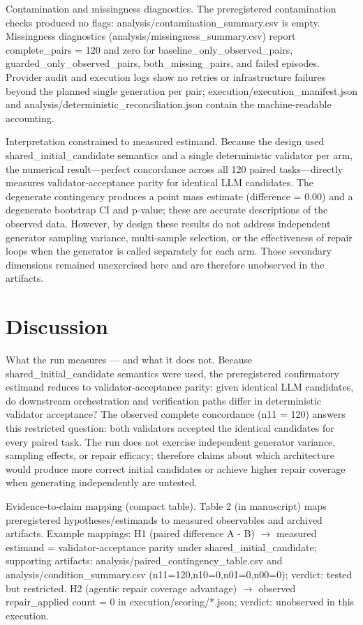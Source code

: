 \documentclass[conference]{IEEEtran}
\begin{document}
Contamination and missingness diagnostics. The preregistered contamination checks produced no flags: analysis/contamination\_summary.csv is empty. Missingness diagnostics (analysis/missingness\_summary.csv) report complete\_pairs = 120 and zero for baseline\_only\_observed\_pairs, guarded\_only\_observed\_pairs, both\_missing\_pairs, and failed episodes. Provider audit and execution logs show no retries or infrastructure failures beyond the planned single generation per pair; execution/execution\_manifest.json and analysis/deterministic\_reconciliation.json contain the machine‑readable accounting.

Interpretation constrained to measured estimand. Because the design used shared\_initial\_candidate semantics and a single deterministic validator per arm, the numerical result---perfect concordance across all 120 paired tasks---directly measures validator‑acceptance parity for identical LLM candidates. The degenerate contingency produces a point mass estimate (difference = 0.00) and a degenerate bootstrap CI and p‑value; these are accurate descriptions of the observed data. However, by design these results do not address independent generator sampling variance, multi‑sample selection, or the effectiveness of repair loops when the generator is called separately for each arm. Those secondary dimensions remained unexercised here and are therefore unobserved in the artifacts.

\section{Discussion}
What the run measures --- and what it does not. Because shared\_initial\_candidate semantics were used, the preregistered confirmatory estimand reduces to validator‑acceptance parity: given identical LLM candidates, do downstream orchestration and verification paths differ in deterministic validator acceptance? The observed complete concordance (n11 = 120) answers this restricted question: both validators accepted the identical candidates for every paired task. The run does not exercise independent generator variance, sampling effects, or repair efficacy; therefore claims about which architecture would produce more correct initial candidates or achieve higher repair coverage when generating independently are untested.

Evidence‑to‑claim mapping (compact table). Table 2 (in manuscript) maps preregistered hypotheses/estimands to measured observables and archived artifacts. Example mappings: H1 (paired difference A - B) \ensuremath{\rightarrow} measured estimand = validator‑acceptance parity under shared\_initial\_candidate; supporting artifacts: analysis/paired\_contingency\_table.csv and analysis/condition\_summary.csv (n11=120,n10=0,n01=0,n00=0); verdict: tested but restricted. H2 (agentic repair coverage advantage) \ensuremath{\rightarrow} observed repair\_applied count = 0 in execution/scoring/*.json; verdict: unobserved in this execution.
\end{document}
